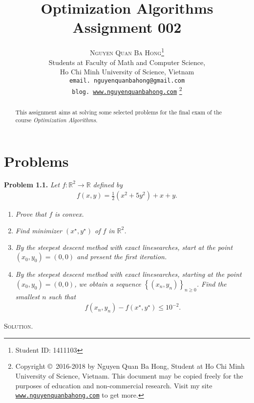 \documentclass[a4paper]{article}
\title{\huge Optimization Algorithms Assignment 002}
\author{\textsc{Nguyen Quan Ba Hong}\footnote{Student ID: 1411103}\\
{\small Students at Faculty of Math and Computer Science,}\\ 
{\small Ho Chi Minh University of Science, Vietnam} \\
{\small \texttt{email. nguyenquanbahong@gmail.com}}\\
{\small \texttt{blog. \url{www.nguyenquanbahong.com}} 
\footnote{Copyright \copyright\ 2016-2018 by Nguyen Quan Ba Hong, Student at Ho Chi Minh University of Science, Vietnam. This document may be copied freely for the purposes of education and non-commercial research. Visit my site \texttt{\url{www.nguyenquanbahong.com}} to get more.}}}
\numberwithin{equation}{section}
\begin{document}
\maketitle
\begin{abstract}
This assignment aims at solving some selected problems for the final exam of the course \textit{Optimization Algorithms}.
\end{abstract}
\newpage
\tableofcontents
\newpage
\section{Problems}
\textbf{Problem 1.1.} \textit{Let $f:\mathbb{R}^2 \to \mathbb{R}$ defined by}
\begin{align}
f\left( {x,y} \right) = \frac{1}{2}\left( {{x^2} + 5{y^2}} \right) + x + y.
\end{align}
\begin{enumerate}
\item \textit{Prove that $f$ is convex.}
\item \textit{Find minimizer $\left(x^\star,y^\star \right)$ of $f$ in $\mathbb{R}^2$.}
\item \textit{By the steepest descent method with exact linesearches, start at the point $\left( {{x_0},{y_0}} \right) = \left( {0,0} \right)$ and present the first iteration.}
\item \textit{By the steepest descent method with exact linesearches, starting at the point $\left( {{x_0},{y_0}} \right) = \left( {0,0} \right)$, we obtain a sequence ${\left\{ {\left( {{x_n},{y_n}} \right)} \right\}_{n \ge 0}}$. Find the smallest $n$ such that}
\begin{align}
\label{1.2}
f\left( {{x_n},{y_n}} \right) - f\left( {{x^\star},{y^\star}} \right) \le {10^{ - 2}}.
\end{align}
\end{enumerate}
\textsc{Solution.}
\end{document}
